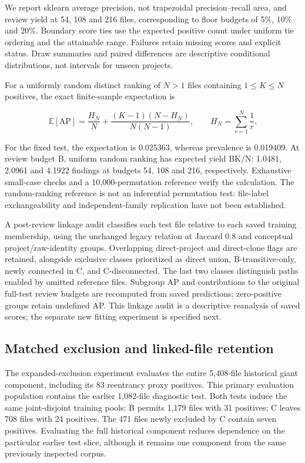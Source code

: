 \documentclass[preprint,12pt]{elsarticle}
\begin{document}
We report sklearn average precision, not trapezoidal precision--recall area, and review yield at 54, 108 and 216 files, corresponding to floor budgets of 5\%, 10\% and 20\%. Boundary score ties use the expected positive count under uniform tie ordering and the attainable range. Failures retain missing scores and explicit status. Draw summaries and paired differences are descriptive conditional distributions, not intervals for unseen projects.

For a uniformly random distinct ranking of \(N>1\) files containing \(1\le K\le N\) positives, the exact finite-sample expectation is

\[
\mathbb E[\mathrm{AP}]=\frac{H_N}{N}+\frac{(K-1)(N-H_N)}{N(N-1)},
\qquad H_N=\sum_{r=1}^{N}\frac1r.
\]

For the fixed test, the expectation is 0.025363, whereas prevalence is 0.019409. At review budget B, uniform random ranking has expected yield BK/N: 1.0481, 2.0961 and 4.1922 findings at budgets 54, 108 and 216, respectively. Exhaustive small-case checks and a 10,000-permutation reference verify the calculation. The random-ranking reference is not an inferential permutation test: file-label exchangeability and independent-family replication have not been established.

A post-review linkage audit classifies each test file relative to each saved training membership, using the unchanged legacy relation at Jaccard 0.8 and conceptual project/raw-identity groups. Overlapping direct-project and direct-clone flags are retained, alongside exclusive classes prioritized as direct union, B-transitive-only, newly connected in C, and C-disconnected. The last two classes distinguish paths enabled by omitted reference files. Subgroup AP and contributions to the original full-test review budgets are recomputed from saved predictions; zero-positive groups retain undefined AP. This linkage audit is a descriptive reanalysis of saved scores; the separate new fitting experiment is specified next.

\subsection{Matched exclusion and linked-file retention}\label{matched-exclusion-and-linked-file-retention}

The expanded-exclusion experiment evaluates the entire 5,408-file historical giant component, including its 83 reentrancy proxy positives. This primary evaluation population contains the earlier 1,082-file diagnostic test. Both tests induce the same joint-disjoint training pools: B permits 1,179 files with 31 positives; C leaves 708 files with 24 positives. The 471 files newly excluded by C contain seven positives. Evaluating the full historical component reduces dependence on the particular earlier test slice, although it remains one component from the same previously inspected corpus.
\end{document}
